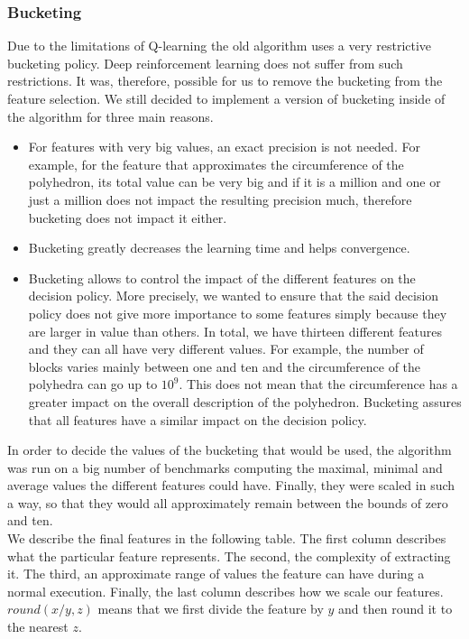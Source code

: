 \subsubsection{Bucketing}
Due to the limitations of Q-learning the old algorithm uses a very restrictive bucketing policy. Deep reinforcement learning does not suffer from such restrictions. It was, therefore, possible for us to remove the bucketing from the feature selection. We still decided to implement a version of bucketing inside of the algorithm for three main reasons. \\
\begin{itemize}
	\item For features with very big values, an exact precision is not needed. For example, for the feature that approximates the circumference of the polyhedron, its total value can be very big and if it is a million and one or just a million does not impact the resulting precision much, therefore bucketing does not impact it either.
	\item Bucketing greatly decreases the learning time and helps convergence.
	\item Bucketing allows to control the impact of the different features on the decision policy. More precisely, we wanted to ensure that the said decision policy does not give more importance to some features simply because they are larger in value than others. In total, we have thirteen different features and they can all have very different values. For example, the number of blocks varies mainly between one and ten and the circumference of the polyhedra can go up to $10^9$. This does not mean that the circumference has a greater impact on the overall description of the polyhedron. Bucketing assures that all features have a similar impact on the decision policy.
\end{itemize}
In order to decide the values of the bucketing that would be used,  the algorithm was run on a big number of benchmarks computing the maximal, minimal and average values the different features could have. Finally, they were scaled in such a way, so that they would all approximately remain between the bounds of zero and ten.\\
We describe the final features in the following table. The first column describes what the particular feature represents. The second, the complexity of extracting it. The third, an approximate range of values the feature can have during a normal execution. Finally, the last column describes how we scale our features. $round(x/y,z)$ means that we first divide the feature by $y$ and then round it to the nearest $z$.



